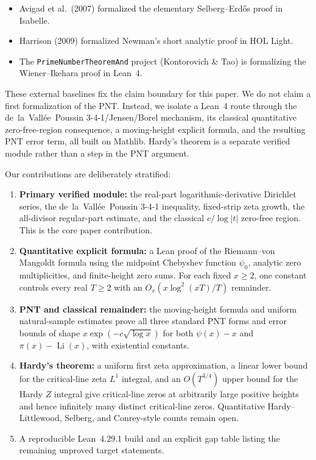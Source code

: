 \documentclass[11pt,a4paper]{article}
\theoremstyle{remark}
\begin{document}
\begin{itemize}[noitemsep]
  \item Avigad et al.\ (2007) formalized the elementary Selberg--Erd\H{o}s
    proof in Isabelle.
  \item Harrison (2009) formalized Newman's short analytic proof in HOL Light.
  \item The \texttt{PrimeNumberTheoremAnd} project (Kontorovich \& Tao) is
    formalizing the Wiener--Ikehara proof in Lean~4.
\end{itemize}

These external baselines fix the claim boundary for this paper.  We do not
claim a first formalization of the PNT.  Instead, we isolate a Lean~4 route
through the de~la~Vall\'ee~Poussin 3-4-1/Jensen/Borel mechanism, its classical
quantitative zero-free-region consequence, a moving-height explicit formula,
and the resulting PNT error term, all built on Mathlib.  Hardy's theorem is a
separate verified module rather than a step in the PNT argument.

Our contributions are deliberately stratified:

\begin{enumerate}[noitemsep]
  \item \textbf{Primary verified module:} the real-part logarithmic-derivative
    Dirichlet series, the de~la~Vall\'ee~Poussin 3-4-1 inequality, fixed-strip
    zeta growth, the all-divisor regular-part estimate, and the classical
    \(c/\log|t|\) zero-free region.  This is the core paper contribution.
  \item \textbf{Quantitative explicit formula:} a Lean proof of the
    Riemann--von Mangoldt formula using the midpoint Chebyshev function
    \(\psi_0\), analytic zero multiplicities, and finite-height zero sums.  For
    each fixed \(x\ge2\), one constant controls every real \(T\ge2\) with an
    \(O_x(x\log^2(xT)/T)\) remainder.
  \item \textbf{PNT and classical remainder:} the moving-height formula and
    uniform natural-sample estimates prove all three standard PNT forms and
    error bounds of shape
    \(x\exp(-c\sqrt{\log x})\) for both \(\psi(x)-x\) and
    \(\pi(x)-\operatorname{Li}(x)\), with existential constants.
  \item \textbf{Hardy's theorem:} a uniform first zeta approximation, a linear
    lower bound for the critical-line zeta \(L^1\) integral, and an
    \(O(T^{3/4})\) upper bound for the Hardy \(Z\) integral give critical-line
    zeros at arbitrarily large positive heights and hence infinitely many
    distinct critical-line zeros.  Quantitative Hardy--Littlewood, Selberg,
    and Conrey-style counts remain open.
  \item A reproducible Lean~4.29.1 build and an explicit gap table listing the
    remaining unproved target statements.
\end{enumerate}
\end{document}
